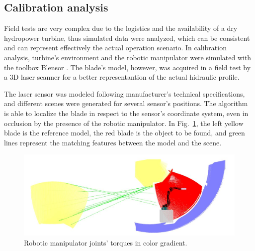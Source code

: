 \subsection{Calibration analysis}

Field tests are very complex due to the logistics and the availability of a dry
hydropower turbine, thus simulated data were analyzed, which can be consistent
and can represent effectively the actual operation scenario. In calibration
analysis, turbine's environment and the robotic manipulator were simulated with
the toolbox Blensor \cite{Gschwandtner11b}. The blade's model, however, was
acquired in a field test by a 3D laser scanner for a better representantion of
the actual hidraulic profile.

The laser sensor was modeled following manufacturer's technical
specifications, and different scenes were generated for several sensor's
positions. The algorithm is able to localize the blade in respect to the
sensor's coordinate system, even in occlusion by the presence of the robotic
manipulator. In Fig.~\ref{fig:calibration}, the left yellow blade is the
reference model, the red blade is the object to be found, and green lines
represent the matching features between the model and the scene.

\begin{figure}
	\centering
	\includegraphics[width=.95\columnwidth]{figs/results/sim_mh12_sp}
    \caption{Robotic manipulator joints' torques in color gradient.}
    \label{fig:calibration}
\end{figure}